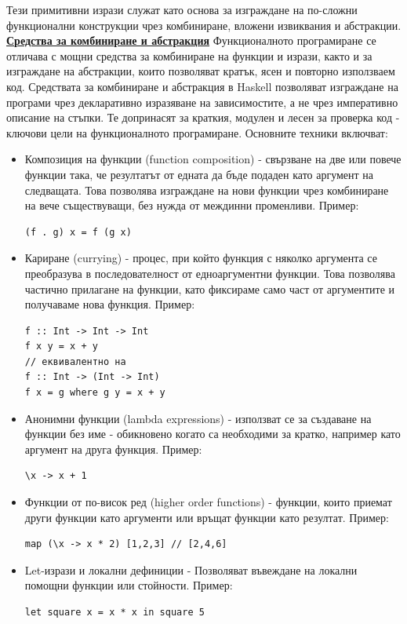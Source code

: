 \documentclass{article}
\begin{document}
Тези примитивни изрази служат като основа за изграждане на по-сложни функционални конструкции чрез комбиниране, вложени извиквания и абстракции. \newline\newline
\textbf{\underline{Средства за комбиниране и абстракция}} \newline\newline
Функционалното програмиране се отличава с мощни средства за комбиниране на функции и изрази, както и за изграждане на абстракции, които позволяват кратък, ясен и повторно
използваем код. Средствата за комбиниране и абстракция в Haskell позволяват изграждане на програми чрез декларативно изразяване на зависимостите, а не чрез императивно
описание на стъпки. Те допринасят за краткия, модулен и лесен за проверка код - ключови цели на функционалното програмиране. Основните техники включват:
\begin{itemize}
    \item Композиция на функции (function composition) - свързване на две или повече функции така, че резултатът от едната да бъде подаден като аргумент на следващата.
    Това позволява изграждане на нови функции чрез комбиниране на вече съществуващи, без нужда от междинни променливи. Пример:
\begin{lstlisting}[style=cpp]
(f . g) x = f (g x)
\end{lstlisting}
    \item Кариране (currying) - процес, при който функция с няколко аргумента се преобразува в последователност от едноаргументни функции. Това позволява частично прилагане на функции,
    като фиксираме само част от аргументите и получаваме нова функция. Пример:
\begin{lstlisting}[style=cpp]
f :: Int -> Int -> Int
f x y = x + y
// еквивалентно на
f :: Int -> (Int -> Int)
f x = g where g y = x + y
\end{lstlisting}
    \item Анонимни функции (lambda expressions) - използват се за създаване на функции без име - обикновено когато са необходими за кратко, например като аргумент на друга функция. Пример:
\begin{lstlisting}[style=cpp]
\x -> x + 1
\end{lstlisting}
    \item Функции от по-висок ред (higher order functions) - функции, които приемат други функции като аргументи или връщат функции като резултат.  Пример:
\begin{lstlisting}[style=cpp]
map (\x -> x * 2) [1,2,3] // [2,4,6]
\end{lstlisting}
    \item Let-изрази и локални дефиниции - Позволяват въвеждане на локални помощни функции или стойности. Пример:
\begin{lstlisting}[style=cpp]
let square x = x * x in square 5
\end{lstlisting}
\end{itemize}
\end{document}

